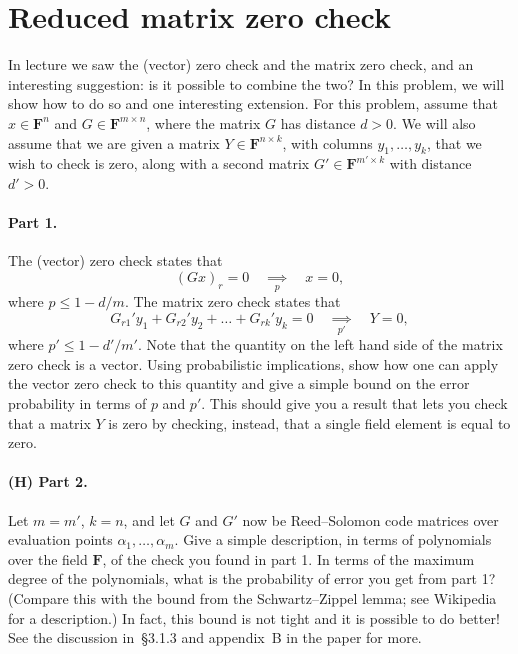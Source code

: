 \documentclass[12pt]{article}
\newcommand{\field}{\mathbf{F}}
\newcommand{\impliesn}[1]{\underset{#1}{\implies}}
\newcommand{\impliesp}{\impliesn{p}}
\newcommand{\impliespp}{\impliesn{p'}}
\begin{document}
\section{Reduced matrix zero check}
In lecture we saw the (vector) zero check and the matrix zero check, and an
interesting suggestion: is it possible to combine the two? In this problem, we
will show how to do so and one interesting extension. For this problem, assume
that $x \in \field^n$ and $G\in \field^{m\times n}$, where the matrix $G$ has
distance $d > 0$. We will also assume that we are given a matrix $Y\in
\field^{n \times k}$, with columns $y_1, \dots, y_k$, that we wish to check is
zero, along with a second matrix $G' \in \field^{m' \times k}$ with distance
$d' > 0$.

\paragraph{Part 1.} The (vector) zero check states that
\[
    (Gx)_r = 0 \quad \impliesp \quad x = 0,
\]
where $p \le 1 - d/m$. The matrix zero check states that
\[
    G_{r1}'y_1 + G_{r2}'y_2 + \dots + G_{rk}'y_k = 0 \quad \impliespp \quad Y = 0,
\]
where $p' \le 1-d'/m'$. Note that the quantity on the left hand side of the
matrix zero check is a vector. Using probabilistic implications, show how one
can apply the vector zero check to this quantity and give a simple bound on the
error probability in terms of $p$ and $p'$. This should give you a result
that lets you check that a matrix $Y$ is zero by checking, instead, that
a single field element is equal to zero.

\paragraph{(H) Part 2.} Let $m=m'$, $k=n$, and let $G$ and $G'$ now be
Reed--Solomon code matrices over evaluation points $\alpha_1, \dots, \alpha_m$.
Give a simple description, in terms of polynomials over the field $\field$, of
the check you found in part 1. In terms of the maximum degree of the
polynomials, what is the probability of error you get from part 1? (Compare
this with the bound from the Schwartz--Zippel lemma; see Wikipedia for a
description.) In fact, this bound is not tight and it is possible to do better!
See the discussion in~\S3.1.3 and appendix~B in the paper for more.
\end{document}
